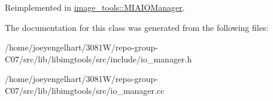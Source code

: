 Reimplemented in \hyperlink{classimage__tools_1_1MIAIOManager_a209180ddcfe3bf43d8fd7c6635391ea4}{image\+\_\+tools\+::\+M\+I\+A\+I\+O\+Manager}.



The documentation for this class was generated from the following files\+:\begin{DoxyCompactItemize}
\item 
/home/joeyengelhart/3081\+W/repo-\/group-\/\+C07/src/lib/libimgtools/src/include/io\+\_\+manager.\+h\item 
/home/joeyengelhart/3081\+W/repo-\/group-\/\+C07/src/lib/libimgtools/src/io\+\_\+manager.\+cc\end{DoxyCompactItemize}
